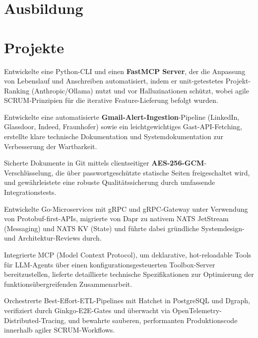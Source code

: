 \documentclass[10pt,a4paper]{resume}
\begin{document}
\section{Ausbildung}

\vspace{2pt}

\section{Projekte}

\bullets
  \item Entwickelte eine Python-CLI und einen \textbf{FastMCP Server}, der die Anpassung von Lebenslauf und Anschreiben automatisiert, indem er unit-getestetes Projekt-Ranking (Anthropic/Ollama) nutzt und vor Halluzinationen schützt, wobei agile SCRUM-Prinzipien für die iterative Feature-Lieferung befolgt wurden.
  \item Entwickelte eine automatisierte \textbf{Gmail-Alert-Ingestion}-Pipeline (LinkedIn, Glassdoor, Indeed, Fraunhofer) sowie ein leichtgewichtiges Gast-API-Fetching, erstellte klare technische Dokumentation und Systemdokumentation zur Verbesserung der Wartbarkeit.
  \item Sicherte Dokumente in Git mittels clientseitiger \textbf{AES-256-GCM}-Verschlüsselung, die über passwortgeschützte statische Seiten freigeschaltet wird, und gewährleistete eine robuste Qualitätssicherung durch umfassende Integrationstests.
\bulletsend
\vspace{1.0pt}
\bullets
  \item Entwickelte Go-Microservices mit gRPC und gRPC-Gateway unter Verwendung von Protobuf-first-APIs, migrierte von Dapr zu nativem NATS JetStream (Messaging) und NATS KV (State) und führte dabei gründliche Systemdesign- und Architektur-Reviews durch.
  \item Integrierte MCP (Model Context Protocol), um deklarative, hot-reloadable Tools für LLM-Agents über einen konfigurationsgesteuerten Toolbox-Server bereitzustellen, lieferte detaillierte technische Spezifikationen zur Optimierung der funktionsübergreifenden Zusammenarbeit.
  \item Orchestrerte Best-Effort-ETL-Pipelines mit Hatchet in PostgreSQL und Dgraph, verifiziert durch Ginkgo-E2E-Gates und überwacht via OpenTelemetry-Distributed-Tracing, und bewahrte sauberen, performanten Produktionscode innerhalb agiler SCRUM-Workflows.
\bulletsend
\end{document}
